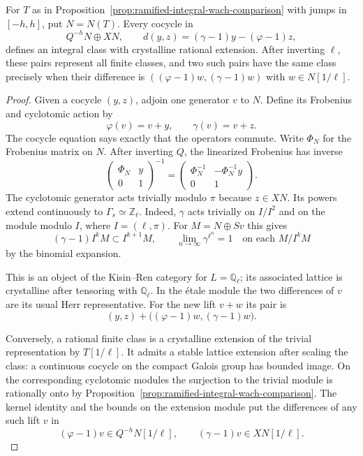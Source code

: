 \begin{lemma}\label{lem:ramified-restricted-herr}
For \(T\) as in Proposition~\ref{prop:ramified-integral-wach-comparison} with jumps in \([-h,h]\), put \(N=N(T)\). Every cocycle in
\[
   Q^{-h}N\oplus XN,\qquad
   d(y,z)=(\gamma-1)y-(\varphi-1)z ,
\]
defines an integral class with crystalline rational extension. After inverting \(\ell\), these pairs represent all finite classes, and two such pairs have the same class precisely when their difference is \(((\varphi-1)w,(\gamma-1)w)\) with \(w\in N[1/\ell]\).
\end{lemma}

\begin{proof}
Given a cocycle \((y,z)\), adjoin one generator \(v\) to \(N\). Define its Frobenius and cyclotomic action by
\[
      \varphi(v)=v+y,\qquad\gamma(v)=v+z .
\]
The cocycle equation says exactly that the operators commute. Write \(\Phi_N\) for the Frobenius matrix on \(N\). After inverting \(Q\), the linearized Frobenius has inverse
\[
   \begin{pmatrix}\Phi_N & y\\ 0 & 1\end{pmatrix}^{-1}
     =\begin{pmatrix}\Phi_N^{-1}&-\Phi_N^{-1}y\\0&1\end{pmatrix}.
\] The cyclotomic generator acts trivially modulo \(\pi\) because \(z\in XN\). Its powers extend continuously to \(\Gamma_s\simeq\mathbb Z_\ell\). Indeed, \(\gamma\) acts trivially on \(I/I^2\) and on the module modulo \(I\), where \(I=(\ell,\pi)\). For \(M=N\oplus Sv\) this gives
\[
  (\gamma-1)I^kM\subset I^{k+1}M,\qquad
  \lim_{n\to\infty}\gamma^{\ell^n}=1\quad\text{on each }M/I^kM
\]
by the binomial expansion.

This is an object of the Kisin--Ren category for \(L=\mathbb Q_\ell\); its associated lattice is crystalline after tensoring with \(\mathbb Q_\ell\). In the étale module the two differences of \(v\) are its usual Herr representative. For the new lift \(v+w\) its pair is
\[
    (y,z)+\bigl((\varphi-1)w,(\gamma-1)w\bigr).
\] \cite[Theorem~1.6 and Corollary~3.3.8]{kisin-ren-lubin-tate}

Conversely, a rational finite class is a crystalline extension of the trivial representation by \(T[1/\ell]\). It admits a stable lattice extension after scaling the class: a continuous cocycle on the compact Galois group has bounded image. On the corresponding cyclotomic modules the surjection to the trivial module is rationally onto by Proposition~\ref{prop:ramified-integral-wach-comparison}. The kernel identity and the bounds on the extension module put the differences of any such lift \(v\) in
\[
  (\varphi-1)v\in Q^{-h}N[1/\ell],\qquad
  (\gamma-1)v\in XN[1/\ell].
\]


\end{proof}
